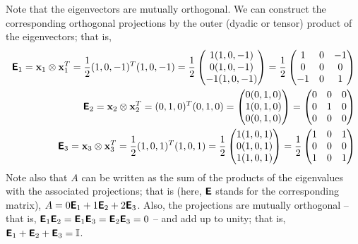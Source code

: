 {Note that the eigenvectors are mutually orthogonal.
We can construct the corresponding orthogonal projections by the outer (dyadic or tensor) product
of the eigenvectors; that is,
\begin{equation}
\begin{split}
\textsf{\textbf{E}}_1 =
{\bf x}_1 \otimes {\bf x}_1^T =
\frac{1}{2} (1,0,-1)^T(1,0,-1) =
\frac{1}{2}
\begin{pmatrix}
1(1,0,-1)\\
0(1,0,-1)\\
-1(1,0,-1)
\end{pmatrix} =
\frac{1}{2}
\begin{pmatrix}
1&0&-1\\
0&0&0\\
-1&0&1
\end{pmatrix}
\\
\textsf{\textbf{E}}_{2} =
{\bf x}_{2} \otimes {\bf x}_{2}^T =
 (0,1,0)^T(0,1,0) =
\begin{pmatrix}
0(0,1,0)\\
1(0,1,0)\\
0(0,1,0)
\end{pmatrix} =
\begin{pmatrix}
0&0&0\\
0&1&0\\
0&0&0
\end{pmatrix}
\\
\textsf{\textbf{E}}_{3} =
{\bf x}_{3} \otimes {\bf x}_{3}^T =
\frac{1}{2} (1,0,1)^T(1,0,1) =
\frac{1}{2}
\begin{pmatrix}
1(1,0,1)\\
0(1,0,1)\\
1(1,0,1)
\end{pmatrix} =
\frac{1}{2}
\begin{pmatrix}
1&0&1\\
0&0&0\\
1&0&1
\end{pmatrix}
\end{split}
\end{equation}
Note also that $A$ can be written as the sum of the products of the
eigenvalues with the associated projections; that is (here, $\textsf{\textbf{E}}$
stands for the corresponding matrix),
$A= 0  \textsf{\textbf{E}}_1 + 1  \textsf{\textbf{E}}_{2} +2\textsf{\textbf{E}}_{3} $.
Also, the projections are mutually orthogonal
-- that is,
$\textsf{\textbf{E}}_1 \textsf{\textbf{E}}_2 = \textsf{\textbf{E}}_1\textsf{\textbf{E}}_3=\textsf{\textbf{E}}_2\textsf{\textbf{E}}_3=0$
--
and add up to unity; that is,
$\textsf{\textbf{E}}_1+\textsf{\textbf{E}}_2+\textsf{\textbf{E}}_3={\Bbb I}$.
{\textrm{\eexample}}
}

